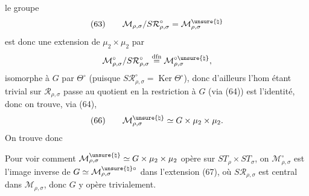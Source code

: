 le groupe
\[
(63)\qquad
\mathcal M_{\rho,\sigma}/S\mathcal R_{\rho,\sigma}^{\circ}
=\mathcal M_{\rho,\sigma}^{\unsure{\natural}}
\]
est donc une extension de $\mu_2\times\mu_2$ par
\[
\mathcal M_{\rho,\sigma}^{\circ}/S\mathcal R_{\rho,\sigma}^{\circ}
\overset{\mathrm{dfn}}{=}
\mathcal M_{\rho,\sigma}^{\circ\unsure{\natural}},
\]
isomorphe à $G$ par $\Theta^\circ$
(puisque $S\mathcal R_{\rho,\sigma}^{\circ}=\operatorname{Ker}\Theta^\circ$), donc
d'ailleurs l'hom
étant trivial sur $\mathcal R_{\rho,\sigma}$ passe au quotient en
 la restriction à $G$ (via (64)) est l'identité,
donc on trouve, via (64),
\[
(66)\qquad
\mathcal M_{\rho,\sigma}^{\unsure{\natural}}\simeq
G\times\mu_2\times\mu_2.
\]
On trouve donc

Pour voir comment
$\mathcal M_{\rho,\sigma}^{\unsure{\natural}}\simeq G\times\mu_2\times\mu_2$
opère sur $ST_\rho\times ST_\sigma$, on
$\mathcal M_{\rho,\sigma}^{\circ}$ est l'image inverse de
$G\simeq\mathcal M_{\rho,\sigma}^{\unsure{\natural}\circ}$
dans l'extension (67), où $S\mathcal R_{\rho,\sigma}$ est central
dans $\mathcal M_{\rho,\sigma}$, donc $G$ y opère trivialement.

